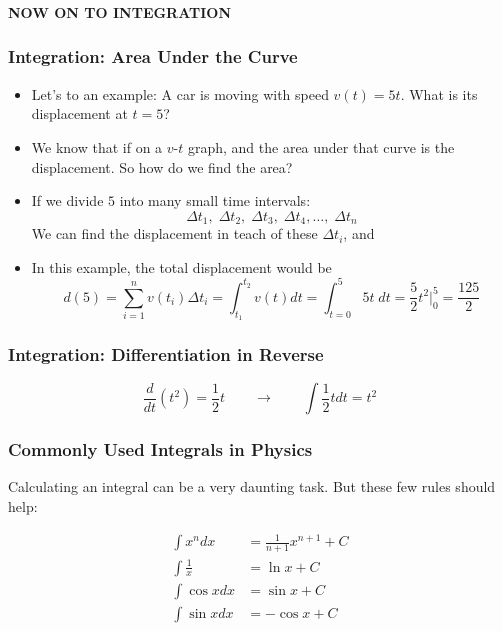 \documentclass[12pt,compress,aspectratio=169]{beamer}
\begin{document}
\begin{frame}
  \frametitle{}
  \begin{center}
    {\LARGE\textbf{NOW ON TO INTEGRATION}}
  \end{center}
\end{frame}

\begin{frame}
  \frametitle{Integration: Area Under the Curve}

  \begin{itemize}
  \item Let's to an example: A car is moving with speed $v(t)=5t$. What is its
    displacement at $t=5$?
  \item We know that if on a $v$-$t$ graph, and the area under that curve is
    the displacement. So how do we find the area?
  \item If we divide $5$ into many small time intervals:
    \begin{displaymath}
      \Delta t_1,\;\Delta t_2,\;\Delta t_3,\;\Delta t_4,\ldots,\;\Delta t_n
    \end{displaymath}
    We can find the displacement in teach of these $\Delta t_i$, and
  \item In this example, the total displacement would be  
    \begin{displaymath}
      d(5)=\sum_{i=1}^{n}v(t_i)\Delta t_i=\int_{t_1}^{t_2}v(t)dt=
      \int_{t=0}^{5}5t\;dt=\frac{5}{2}t^2\Big|^5_0=\frac{125}{2}
    \end{displaymath}
  \end{itemize}
\end{frame}

\begin{frame}
  \frametitle{Integration: Differentiation in Reverse}
  \begin{displaymath}
    \frac{d}{dt}\left(t^2\right)=\frac{1}{2}t
    \quad\quad\longrightarrow\quad\quad
    \int\frac{1}{2}tdt=t^2
  \end{displaymath}
\end{frame}

\begin{frame}
  \frametitle{Commonly Used Integrals in Physics}
  Calculating an integral can be a very daunting task. But these few rules
  should help:

  \begin{align*}
    \int x^ndx&=\frac{1}{n+1}x^{n+1}+C\\
    \int \frac{1}{x}&=\ln x+C\\
    \int\cos xdx&=\sin x+C\\
    \int\sin xdx&=-\cos x+C
  \end{align*}
\end{frame}
\end{document}
